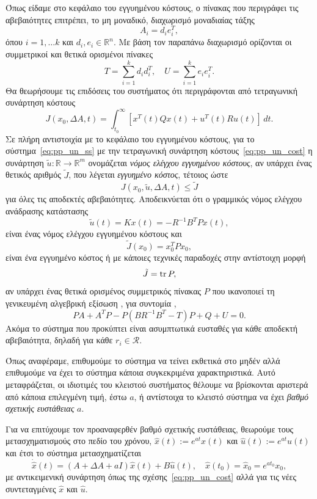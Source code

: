 Όπως είδαμε στο κεφάλαιο του εγγυημένου κόστους, ο πίνακας που περιγράφει τις
αβεβαιότητες επιτρέπει, το μη μοναδικό, διαχωρισμό μοναδιαίας τάξης
\[
    A_i = d_ie_i^T,
\]
όπου \( i = 1, \dots k \) και \( d_i, e_i \in \mathbb{R}^n \). Με βάση τον
παραπάνω διαχωρισμό ορίζονται οι συμμετρικοί και θετικά ορισμένοι πίνακες
\[
   T = \sum_{i = 1}^k d_id_i^T, \quad
   U = \sum_{i = 1}^k e_ie_i^T.
\]
Θα θεωρήσουμε τις επιδόσεις του συστήματος ότι περιγράφονται από τετραγωνική
συνάρτηση κόστους
\begin{equation}\label{eq:pp_un_cost}
    J(x_0, \Delta A, t) = \int_{t_0}^{\infty}
    \left[ x^T(t)Qx(t) + u^T(t)Ru(t) \right] \, dt.
\end{equation}
Σε πλήρη αντιστοιχία με το κεφάλαιο του εγγυημένου κόστους, για το
σύστημα~\eqref{eq:pp_un_ss} με την τετραγωνική συνάρτηση
κόστους~\eqref{eq:pp_un_cost} η συνάρτηση \( \tilde{u}:\mathbb{R} \to
\mathbb{R}^m \) ονομάζεται \emph{νόμος ελέγχου εγγυημένου κόστους}, αν υπάρχει
ένας θετικός αριθμός \( \tilde{J} \), που λέγεται \emph{εγγυημένο κόστος},
τέτοιος ώστε
\[
    J(x_0, \tilde{u}, \Delta A, t) \leq \tilde{J}
\]
για όλες τις αποδεκτές αβεβαιότητες. Αποδεικνύεται ότι ο γραμμικός νόμος
ελέγχου ανάδρασης κατάστασης
\[
    \tilde{u}(t) = Kx(t) = - R^{-1}B^{T}Px(t),
\]
είναι ένας νόμος ελέγχου εγγυημένου κόστους και
\[
    \tilde{J}(x_0) = x_0^{T}Px_0,
\]
είναι ένα εγγυημένο κόστος ή με κάποιες τεχνικές παραδοχές στην αντίστοιχη
μορφή
\begin{equation}\label{eq:pp_un_gcc_J}
    \tilde{J} = \operatorname{tr}{P},
\end{equation}
αν υπάρχει ένας θετικά ορισμένος συμμετρικός πίνακας \( P \) που ικανοποιεί τη
γενικευμένη αλγεβρική εξίσωση , για συντομία ,
\begin{equation}\label{eq:pp_un_gare_general}
    PA + A^{T}P - P(BR^{-1}B^{T} - T)P + Q + U = 0.
\end{equation}
Ακόμα το σύστημα που προκύπτει είναι ασυμπτωτικά ευσταθές για κάθε αποδεκτή
αβεβαιότητα, δηλαδή για κάθε \( r_i \in \mathcal{R} \).

Όπως αναφέραμε, επιθυμούμε το σύστημα να τείνει εκθετικά στο μηδέν αλλά
επιθυμούμε να έχει το σύστημα κάποια συγκεκριμένα χαρακτηριστικά. Αυτό
μεταφράζεται, οι ιδιοτιμές του κλειστού συστήματος θέλουμε να βρίσκονται
αριστερά από κάποια επιλεγμένη τιμή, έστω \( a \), ή αντίστοιχα το κλειστό
σύστημα να έχει \emph{βαθμό σχετικής ευστάθειας} \( a \).

Για να επιτύχουμε τον προαναφερθέν βαθμό σχετικής ευστάθειας, θεωρούμε τους
μετασχηματισμούς στο πεδίο του χρόνου, \( \hat{x}(t) := e^{at}x(t) \)
και \( \hat{u}(t) := e^{at}u(t) \) και έτσι το σύστημα μετασχηματίζεται
\begin{equation}\label{eq:pp_un_a}
    \dot{\hat{x}}(t) = (A + \Delta A + aI)\hat{x}(t) + B\hat{u}(t), \quad
    \hat{x}(t_0) = \hat{x}_0 = e^{at_0}x_0,
\end{equation}
με αντικειμενική συνάρτηση όπως της σχέσης~\eqref{eq:pp_un_cost} αλλά για τις
νέες συντεταγμένες \( \hat{x} \) και \( \hat{u} \).

